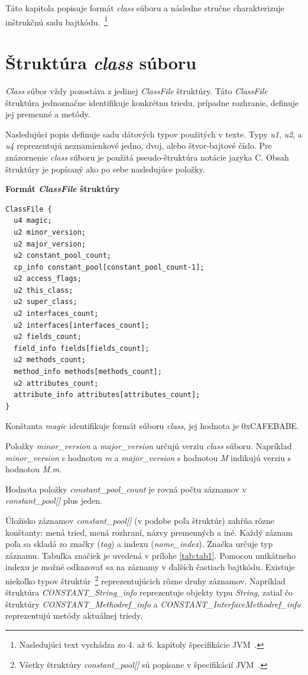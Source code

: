 \documentclass[11pt,final,oneside]{fithesis}
\newenvironment{example}[1]
{
\vspace{3mm}
\noindent\textbf{#1}
\vspace{2mm}
}
{
\vspace{3mm}
}
\begin{document}
Táto kapitola popisuje formát \textit{class} súboru a následne stručne
charakterizuje inštrukčnú sadu bajtkódu.~\footnote{Nasledujúci text vychádza 
zo 4. až 6. kapitoly špecifikácie JVM~\cite{Lindholm:2013:JVM:2462629}.}

\section{Štruktúra \textit{class} súboru}
\label{sec:classFile}
\textit{Class} súbor vždy pozostáva z jedinej \textit{ClassFile} štruktúry.
Táto \textit {ClassFile} štruktúra jednoznačne identifikuje konkrétnu triedu, 
prípadne rozhranie, definuje jej premenné a metódy.

Nasledujúci popis definuje sadu dátových typov použitých v texte. Typy
\textit{u1}, \textit{u2}, a \textit{u4} reprezentujú neznamienkové jedno, 
dvoj, alebo štvor-bajtové číslo. Pre znázornenie \textit{class} súboru je 
použitá pseudo-štruktúra notácie jazyka C. Obsah štruktúry je popísaný ako po 
sebe nasledujúce položky.

\begin{example}{Formát \textit{ClassFile} štruktúry}
\begin{verbatim}
ClassFile {
  u4 magic;
  u2 minor_version;
  u2 major_version;
  u2 constant_pool_count;
  cp_info constant_pool[constant_pool_count-1];
  u2 access_flags;
  u2 this_class;
  u2 super_class;
  u2 interfaces_count;
  u2 interfaces[interfaces_count];
  u2 fields_count;
  field_info fields[fields_count];
  u2 methods_count;
  method_info methods[methods_count];
  u2 attributes_count;
  attribute_info attributes[attributes_count];
}
\end{verbatim}
\end{example}

Konštanta \textit{magic} identifikuje formát súboru \textit{class},
jej hodnota je 0xCAFEBABE.

Položky \textit{minor\_version} a \textit{major\_version}
určujú verziu \textit{class} súboru. Napríklad \textit{minor\_version} s
hodnotou \textit{m} a \textit{major\_version} s hodnotou \textit{M} indikujú
verziu s hodnotou \textit{M.m}.

Hodnota položky \textit{constant\_pool\_count} je rovná počtu záznamov
v \textit{constant\_pool[]} plus jeden.

Úložisko záznamov \textit{constant\_pool[]} (v podobe poľa štruktúr)
zahŕňa rôzne konštanty: mená tried,  mená rozhraní, názvy premenných a iné. 
Každý záznam poľa sa skladá zo značky (\textit{tag}) a indexu
(\textit{name\_index}). Značka určuje typ záznamu. Tabuľka značiek je uvedená
v prílohe \ref{tab:tab1}. Pomocou unikátneho indexu je možné odkazovať sa na
záznamy v ďalších častiach bajtkódu. Existuje niekoľko typov
štruktúr~\footnote{Všetky štruktúry \textit{constant\_pool[]} sú popísane v
špecifikácií JVM~\cite{Lindholm:2013:JVM:2462629}.} reprezentujúcich rôzne
druhy záznamov. Napríklad štruktúra \textit{CONSTANT\_String\_info}
reprezentuje objekty typu \textit{String}, zatiaľ čo štruktúry
\textit{CONSTANT\_Methodref\_info} a 
\textit{CONSTANT\_InterfaceMethodref\_info} reprezentujú metódy aktuálnej 
triedy.
\end{document}
